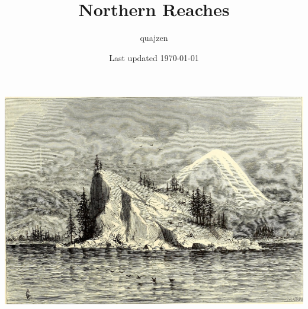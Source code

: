 \documentclass[notitlepage]{article}
\title{Northern Reaches}
\author{quajzen}
\date{Last updated \today}
\begin{document}
\large
\maketitle
\vfill
\includegraphics[width=\textwidth]{cover}
\newpage
\tableofcontents
\listoftables
\newpage
\end{document}
